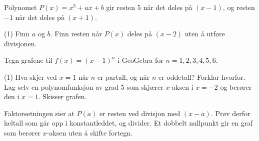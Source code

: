 Polynomet $P(x) = x^3 + ax + b$ gir resten $5$ når det deles på $(x - 1)$, og resten $-1$ når det deles på $(x + 1)$.
\begin{tasks}(1)
  \task Finn $a$ og $b$.
  \task Finn resten når $P(x)$ deles på $(x - 2)$ uten å utføre divisjonen.
\end{tasks}

Tegn grafene til $f(x) = (x - 1)^n$ i GeoGebra for $n = 1, 2, 3, 4, 5, 6$.
\begin{tasks}(1)
  \task Hva skjer ved $x = 1$ når $n$ er partall, og når $n$ er oddetall?
  \task Forklar hvorfor.
  \task Lag selv en polynomfunksjon av grad 5 som skjærer $x$-aksen i $x = -2$ og berører den i $x = 1$. Skisser grafen.
\end{tasks}

\begin{oppsummering}
Faktorsetningen sier at $P(a)$ er resten ved divisjon med $(x - a)$. Prøv derfor heltall som går opp i konstantleddet, og divider.
Et dobbelt nullpunkt gir en graf som berører $x$-aksen uten å skifte fortegn.
\end{oppsummering}
